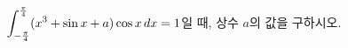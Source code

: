 $\displaystyle\int_{-\frac{\pi}{4}}^{\frac{\pi}{4}}(x^3+\sin x+a)\cos x\mkern3mu dx=1$일 때, 상수 $a$의 값을 구하시오.
